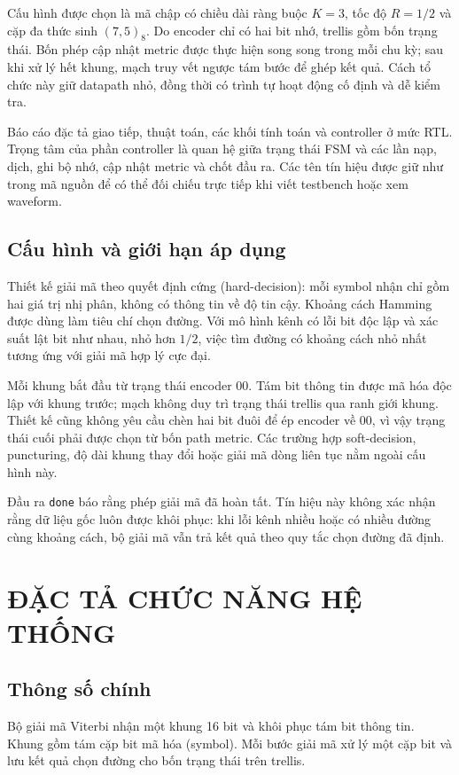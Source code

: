 \documentclass[12pt,a4paper]{article}
\DeclareRobustCommand{\code}[1]{\texttt{#1}}
\renewcommand{\_}{\originalunderscore\allowbreak}
\begin{document}
Cấu hình được chọn là mã chập có chiều dài ràng buộc $K=3$, tốc độ $R=1/2$ và cặp đa thức sinh $(7,5)_8$. Do encoder chỉ có hai bit nhớ, trellis gồm bốn trạng thái. Bốn phép cập nhật metric được thực hiện song song trong mỗi chu kỳ; sau khi xử lý hết khung, mạch truy vết ngược tám bước để ghép kết quả. Cách tổ chức này giữ datapath nhỏ, đồng thời có trình tự hoạt động cố định và dễ kiểm tra.

Báo cáo đặc tả giao tiếp, thuật toán, các khối tính toán và controller ở mức RTL. Trọng tâm của phần controller là quan hệ giữa trạng thái FSM và các lần nạp, dịch, ghi bộ nhớ, cập nhật metric và chốt đầu ra. Các tên tín hiệu được giữ như trong mã nguồn để có thể đối chiếu trực tiếp khi viết testbench hoặc xem waveform.

\subsection{Cấu hình và giới hạn áp dụng}
Thiết kế giải mã theo quyết định cứng (hard-decision): mỗi symbol nhận chỉ gồm hai giá trị nhị phân, không có thông tin về độ tin cậy. Khoảng cách Hamming được dùng làm tiêu chí chọn đường. Với mô hình kênh có lỗi bit độc lập và xác suất lật bit như nhau, nhỏ hơn $1/2$, việc tìm đường có khoảng cách nhỏ nhất tương ứng với giải mã hợp lý cực đại.

Mỗi khung bắt đầu từ trạng thái encoder 00. Tám bit thông tin được mã hóa độc lập với khung trước; mạch không duy trì trạng thái trellis qua ranh giới khung. Thiết kế cũng không yêu cầu chèn hai bit đuôi để ép encoder về 00, vì vậy trạng thái cuối phải được chọn từ bốn path metric. Các trường hợp soft-decision, puncturing, độ dài khung thay đổi hoặc giải mã dòng liên tục nằm ngoài cấu hình này.

Đầu ra \code{done} báo rằng phép giải mã đã hoàn tất. Tín hiệu này không xác nhận rằng dữ liệu gốc luôn được khôi phục: khi lỗi kênh nhiều hoặc có nhiều đường cùng khoảng cách, bộ giải mã vẫn trả kết quả theo quy tắc chọn đường đã định.

\clearpage
\section{ĐẶC TẢ CHỨC NĂNG HỆ THỐNG}
\subsection{Thông số chính}
Bộ giải mã Viterbi nhận một khung 16 bit và khôi phục tám bit thông tin. Khung gồm tám cặp bit mã hóa (symbol). Mỗi bước giải mã xử lý một cặp bit và lưu kết quả chọn đường cho bốn trạng thái trên trellis.
\end{document}
